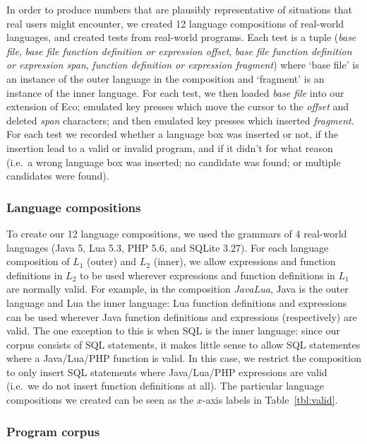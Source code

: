 \documentclass[sigplan,screen]{acmart}\settopmatter{printfolios=true,printccs=false,printacmref=false}
\begin{document}
In order to produce numbers that are plausibly representative of situations
that real users might encounter, we created 12 language compositions of
real-world languages, and created \totalinsertions tests from real-world
programs. Each test is a tuple (\emph{base file}, \emph{base file function
definition or expression offset}, \emph{base file function definition or
expression span}, \emph{function definition or expression fragment}) where
`base file' is an instance of the outer language in the composition and
`fragment' is an instance of the inner language. For each test, we then loaded
\emph{base file} into our extension of Eco; emulated key presses which move the
cursor to the \emph{offset} and deleted \emph{span} characters; and then
emulated key presses which inserted \emph{fragment}. For each test we recorded
 whether a language box was inserted or not, if
the insertion lead to a valid or invalid program, and if it didn't for what
reason (i.e.~a wrong language box was inserted; no candidate was found; or
multiple candidates were found).


\subsubsection{Language compositions}

To create our 12 language compositions, we used the grammars of 4 real-world
languages (Java 5, Lua 5.3, PHP 5.6, and SQLite 3.27).
For each language composition of $L_1$ (outer) and $L_2$ (inner), we allow
expressions and function definitions in $L_2$ to be used wherever expressions
and function definitions in $L_1$ are normally valid. For example, in the
composition \emph{JavaLua}, Java is the outer language and Lua the inner
language: Lua function definitions and expressions can be used wherever Java
function definitions and expressions (respectively) are valid. The one exception
to this is when SQL is the inner language: since our corpus consists of SQL
statements, it makes little sense to allow SQL statementes where a Java/Lua/PHP
function is valid. In this case, we restrict the composition to only insert SQL
statements where Java/Lua/PHP expressions are valid (i.e.~we do not insert
function definitions at all). The
particular language compositions we created can be seen as the $x$-axis labels
in Table~\ref{tbl:valid}.


\subsubsection{Program corpus}
\end{document}
